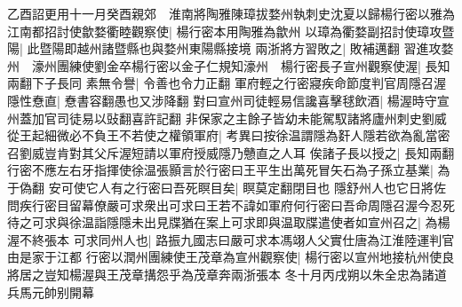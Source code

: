 乙酉詔更用十一月癸酉親郊　淮南將陶雅陳璋拔婺州執刺史沈夏以歸楊行密以雅為江南都招討使歙婺衢睦觀察使|{
	楊行密本用陶雅為歙州}
以璋為衢婺副招討使璋攻暨陽|{
	此暨陽即越州諸暨縣也與婺州東陽縣接境}
兩浙將方習敗之|{
	敗補邁翻}
習進攻婺州　濠州團練使劉金卒楊行密以金子仁規知濠州　楊行密長子宣州觀察使渥|{
	長知兩翻下子長同}
素無令譽|{
	令善也令力正翻}
軍府輕之行密寢疾命節度判官周隱召渥隱性憃直|{
	憃書容翻愚也又涉降翻}
對曰宣州司徒輕易信讒喜擊毬飲酒|{
	楊渥時守宣州蓋加官司徒易以䜴翻喜許記翻}
非保家之主餘子皆幼未能駕馭諸將廬州刺史劉威從王起細微必不負王不若使之權領軍府|{
	考異曰按徐温謂隱為姧人隱若欲為亂當密召劉威豈肯對其父斥渥短請以軍府授威隱乃戇直之人耳}
俟諸子長以授之|{
	長知兩翻}
行密不應左右牙指揮使徐温張顥言於行密曰王平生出萬死冒矢石為子孫立基業|{
	為于偽翻}
安可使它人有之行密曰吾死瞑目矣|{
	瞑莫定翻閉目也}
隱舒州人也它日將佐問疾行密目留幕僚嚴可求衆出可求曰王若不諱如軍府何行密曰吾命周隱召渥今忍死待之可求與徐温詣隱隱未出見牒猶在案上可求即與温取牒遣使者如宣州召之|{
	為楊渥不終張本}
可求同州人也|{
	路振九國志曰嚴可求本馮翊人父實仕唐為江淮陸運判官由是家于江都}
行密以潤州團練使王茂章為宣州觀察使|{
	楊行密以宣州地接杭州使良將居之豈知楊渥與王茂章搆怨乎為茂章奔兩浙張本}
冬十月丙戌朔以朱全忠為諸道兵馬元帥别開幕

